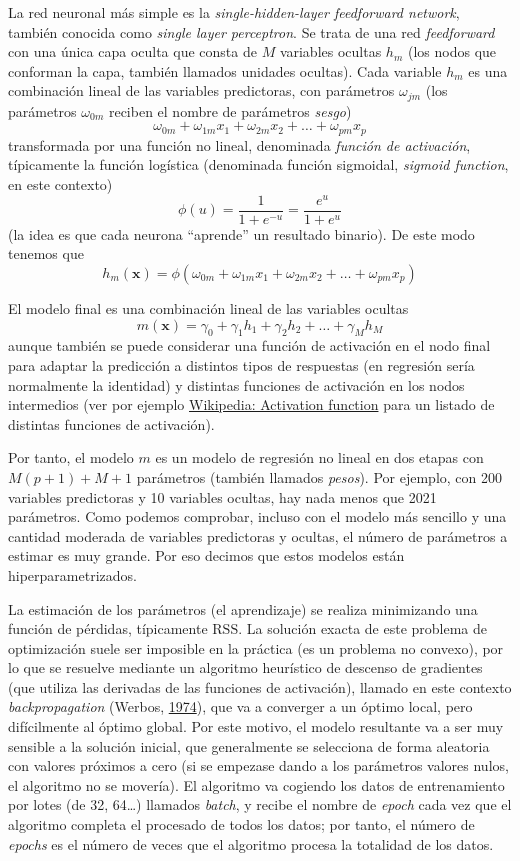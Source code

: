 \documentclass[
  spanish,
]{book}
\theoremstyle{break}
\theoremstyle{definition}
\theoremstyle{definition}
\theoremstyle{definition}
\theoremstyle{remark}
\begin{document}
La red neuronal más simple es la \emph{single-hidden-layer feedforward network}, también conocida como \emph{single layer perceptron}. Se trata de una red \emph{feedforward} con una única capa oculta que consta de \(M\) variables ocultas \(h_m\) (los nodos que conforman la capa, también llamados unidades ocultas). Cada variable \(h_m\) es una combinación lineal de las variables predictoras, con parámetros \(\omega_{jm}\) (los parámetros \(\omega_{0m}\) reciben el nombre de parámetros \emph{sesgo})
\[\omega_{0m} + \omega_{1m} x_1 + \omega_{2m} x_2 + \ldots + \omega_{pm} x_p\]
transformada por una función no lineal, denominada \emph{función de activación}, típicamente la función logística (denominada función sigmoidal, \emph{sigmoid function}, en este contexto)
\[\phi(u) = \frac{1}{1 + e^{-u}} = \frac{e^u}{1 + e^u}\]
(la idea es que cada neurona ``aprende'' un resultado binario).
De este modo tenemos que
\[h_{m}(\mathbf{x}) = \phi\left( \omega_{0m} + \omega_{1m} x_1 + \omega_{2m} x_2 + \ldots + \omega_{pm} x_p \right)\]

El modelo final es una combinación lineal de las variables ocultas
\[m(\mathbf{x}) = \gamma_0 + \gamma_1 h_1 + \gamma_2 h_2 + \ldots + \gamma_M h_M\]
aunque también se puede considerar una función de activación en el nodo final para adaptar la predicción a distintos tipos de respuestas (en regresión sería normalmente la identidad) y distintas funciones de activación en los nodos intermedios (ver por ejemplo \href{https://en.wikipedia.org/wiki/Activation_function}{Wikipedia: Activation function} para un listado de distintas funciones de activación).

Por tanto, el modelo \(m\) es un modelo de regresión no lineal en dos etapas con \(M(p + 1) + M + 1\) parámetros (también llamados \emph{pesos}). Por ejemplo, con 200 variables predictoras y 10 variables ocultas, hay nada menos que 2021 parámetros. Como podemos comprobar, incluso con el modelo más sencillo y una cantidad moderada de variables predictoras y ocultas, el número de parámetros a estimar es muy grande. Por eso decimos que estos modelos están hiperparametrizados.

La estimación de los parámetros (el aprendizaje) se realiza minimizando una función de pérdidas, típicamente \(\mbox{RSS}\). La solución exacta de este problema de optimización suele ser imposible en la práctica (es un problema no convexo), por lo que se resuelve mediante un algoritmo heurístico de descenso de gradientes (que utiliza las derivadas de las funciones de activación), llamado en este contexto \emph{backpropagation} (Werbos, \protect\hyperlink{ref-werbos1974new}{1974}), que va a converger a un óptimo local, pero difícilmente al óptimo global. Por este motivo, el modelo resultante va a ser muy sensible a la solución inicial, que generalmente se selecciona de forma aleatoria con valores próximos a cero (si se empezase dando a los parámetros valores nulos, el algoritmo no se movería). El algoritmo va cogiendo los datos de entrenamiento por lotes (de 32, 64\ldots) llamados \emph{batch}, y recibe el nombre de \emph{epoch} cada vez que el algoritmo completa el procesado de todos los datos; por tanto, el número de \emph{epochs} es el número de veces que el algoritmo procesa la totalidad de los datos.
\end{document}
